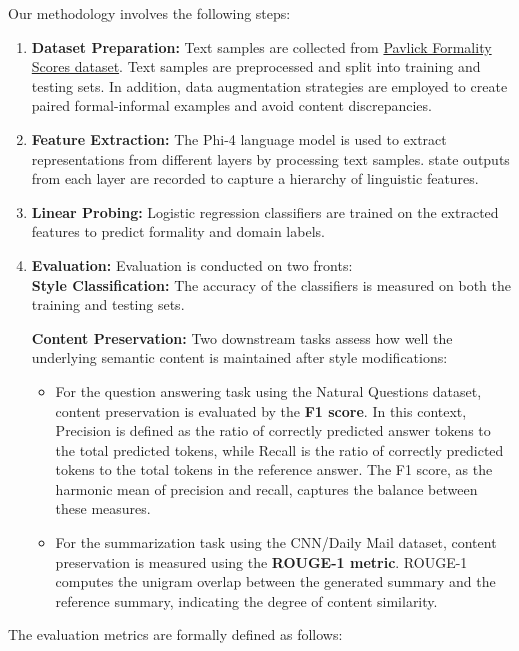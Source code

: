 \documentclass[twocolumn]{article}
\begin{document}
Our methodology involves the following steps:
\begin{enumerate}
    \item \textbf{Dataset Preparation:} Text samples are collected from \href{https://huggingface.co/datasets/osyvokon/pavlick-formality-scores}{Pavlick Formality Scores dataset}. Text samples are preprocessed and split into training and testing sets. In addition, data augmentation strategies are employed to create paired formal-informal examples and avoid content discrepancies.
    \item \textbf{Feature Extraction:} The Phi-4 language model is used to extract representations from different layers by processing text samples. state outputs from each layer are recorded to capture a hierarchy of linguistic features.
    \item \textbf{Linear Probing:} Logistic regression classifiers are trained on the extracted features to predict formality and domain labels.
    \item \textbf{Evaluation:}     Evaluation is conducted on two fronts:\\
    \textbf{Style Classification:}
        The accuracy of the classifiers is measured on both the training and testing sets.

    \textbf{Content Preservation:}
        Two downstream tasks assess how well the underlying semantic content is maintained after style modifications:
        \begin{itemize}
            \item For the question answering task using the Natural Questions dataset, content preservation is evaluated by the \textbf{F1 score}. In this context, Precision is defined as the ratio of correctly predicted answer tokens to the total predicted tokens, while Recall is the ratio of correctly predicted tokens to the total tokens in the reference answer. The F1 score, as the harmonic mean of precision and recall, captures the balance between these measures.
            \item For the summarization task using the CNN/Daily Mail dataset, content preservation is measured using the \textbf{ROUGE-1 metric}. ROUGE-1 computes the unigram overlap between the generated summary and the reference summary, indicating the degree of content similarity.
        \end{itemize}
\end{enumerate}

The evaluation metrics are formally defined as follows:
\end{document}
